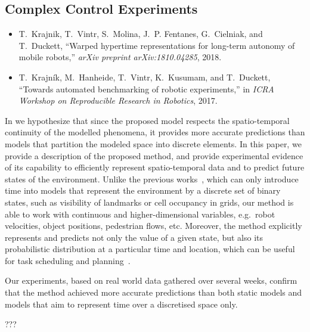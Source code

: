 \subsection{Complex Control Experiments}

\begin{itemize}
    \item T.~Krajnik, T.~Vintr, S.~Molina, J.~P. Fentanes, G.~Cielniak, and T.~Duckett, ``Warped hypertime representations for long-term autonomy of mobile robots,'' \emph{arXiv preprint arXiv:1810.04285}, 2018.
    \item T.~Krajn{\'i}k, M.~Hanheide, T.~Vintr, K.~Kusumam, and T.~Duckett, ``Towards automated benchmarking of robotic experiments,'' in \emph{ICRA Workshop on  Reproducible Research in Robotics}, 2017.
\end{itemize}

In \cite{krajnik2018warped} we hypothesize that since the proposed model respects the spatio-temporal continuity of the modelled phenomena, it provides more accurate predictions than models that partition the modeled space into discrete elements. 
In this paper, we provide a description of the proposed method, and provide experimental evidence of its capability to efficiently represent spatio-temporal data and to predict future states of the environment.
Unlike the previous works~\cite{markov,rosen,kucner,fremen}, which can only introduce time into models that represent the environment by a discrete set of binary states, such as visibility of landmarks or cell occupancy in grids, our method is able to work with continuous and higher-dimensional variables, e.g.\ robot velocities, object positions, pedestrian flows, etc.
Moreover, the method explicitly represents and predicts not only the value of a given state, but also its probabilistic distribution at a particular time and location, which can be useful for task scheduling and planning~\cite{mudrova_ecmr15}.

Our experiments, based on real world data gathered over several weeks, confirm that the method achieved more accurate predictions than both static models and models that aim to represent time over a discretised space only.


???

